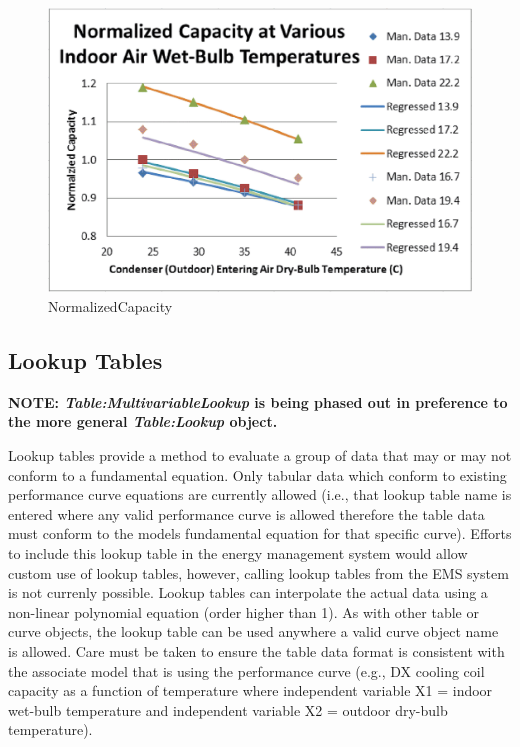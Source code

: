 \begin{figure}[htbp]
\centering
\includegraphics{media/image7873.png}
\caption{NormalizedCapacity}
\end{figure}

\subsection{Lookup Tables}\label{lookup-tables}

\textbf{NOTE: \emph{Table:MultivariableLookup} is being phased out in preference to the more general \emph{Table:Lookup} object.}

Lookup tables provide a method to evaluate a group of data that may or may not conform to a fundamental equation. Only tabular data which conform to existing performance curve equations are currently allowed (i.e., that lookup table name is entered where any valid performance curve is allowed therefore the table data must conform to the models fundamental equation for that specific curve). Efforts to include this lookup table in the energy management system would allow custom use of lookup tables, however, calling lookup tables from the EMS system is not currenly possible. Lookup tables can interpolate the actual data using a non-linear polynomial equation (order higher than 1). As with other table or curve objects, the lookup table can be used anywhere a valid curve object name is allowed. Care must be taken to ensure the table data format is consistent with the associate model that is using the performance curve (e.g., DX cooling coil capacity as a function of temperature where independent variable X1 = indoor wet-bulb temperature and independent variable X2 = outdoor dry-bulb temperature).

